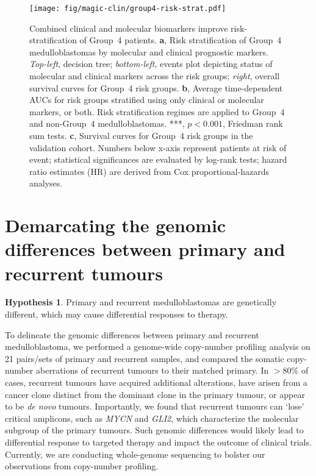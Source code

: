 \documentclass[11pt,letterpaper]{article}
\theoremstyle{definition}
\newtheorem*{hypothesis}{Hypothesis}
\begin{document}
\begin{figure}[h]
	\begin{center}
		\texttt{[image: fig/magic-clin/group4-risk-strat.pdf]}
	\end{center}
	\caption[Combined clinical and molecular biomarkers improve risk-stratification of Group~4 patients]
	{Combined clinical and molecular biomarkers improve risk-stratification of Group~4 patients.
	\textbf{a}, Risk stratification of Group~4 medulloblastomas by molecular and clinical prognostic markers. \emph{Top-left}, decision tree; \emph{bottom-left}, events plot depicting status of molecular and clinical markers across the risk groups; \emph{right}, overall survival curves for Group~4 risk groups.
	\textbf{b}, Average time-dependent AUCs for risk groups stratified using only clinical or molecular markers, or both. Risk stratification regimes are applied to Group~4 and non-Group~4 medulloblastomas. ***, $p < 0.001$, Friedman rank sum tests.
	\textbf{c}, Survival curves for Group~4 risk groups in the validation cohort. 
	Numbers below x-axis represent patients at risk of event; statistical significances are evaluated by log-rank tests; hazard ratio estimates (HR) are derived from Cox proportional-hazards analyses.
	}
	\label{fig:group4-risk-strat}
\end{figure}


\clearpage


\section{Demarcating the genomic differences between primary and recurrent tumours}

\begin{hypothesis}
Primary and recurrent medulloblastomas are genetically different, which may cause differential responses to therapy.
\end{hypothesis}

To delineate the genomic differences between primary and recurrent medulloblastoma, we performed a genome-wide copy-number profiling analysis on 21 pairs/sets of primary and recurrent samples, and compared the somatic copy-number aberrations of recurrent tumours to their matched primary. In $>80\%$ of cases, recurrent tumours have acquired additional alterations, have arisen from a cancer clone distinct from the dominant clone in the primary tumour, or appear to be \emph{de novo} tumours. Importantly, we found that recurrent tumours can `lose' critical amplicons, such as \emph{MYCN} and \emph{GLI2}, which characterize the molecular subgroup of the primary tumours. Such genomic differences would likely lead to differential response to targeted therapy and impact the outcome of clinical trials. Currently, we are conducting whole-genome sequencing to bolster our observations from copy-number profiling.
\end{document}
